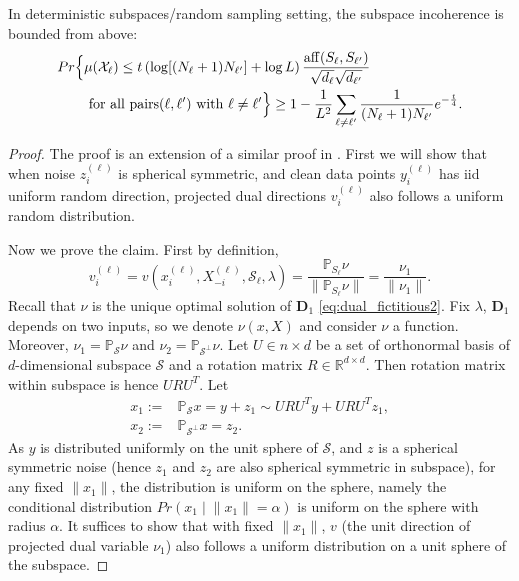 \documentclass[twoside,11pt]{article}
\numberwithin{equation}{section}
\begin{document}
\begin{lemma}\label{lemma:deterministic_incoherence}
In deterministic subspaces/random sampling setting, the subspace incoherence is bounded from above:
\begin{align*}
   Pr\Bigl\{&\mu(\mathcal{X}_{\ell})\leq t\left(\log[(N_{\ell}+1)N_{\ell^\prime}]+\log L\right)\frac{\mathrm{aff}(S_{\ell},S_{\ell^\prime})}{\sqrt{d_{\ell}}\sqrt{d_{\ell^\prime}}}\\
   &\text{ for all pairs}(\ell,\ell^\prime)\text{ with }\ell\neq \ell^\prime\Bigr\}
   \geq 1- \frac{1}{L^2}\sum_{\ell\neq \ell^\prime} \frac{1}{(N_{\ell}+1)N_{\ell^\prime}}e^{-\frac{t}{4}}.
\end{align*}
\end{lemma}
\begin{proof}
The proof is an extension of a similar proof in \citet{soltanolkotabi2011geometric}.
First we will show that when noise $z_i^{(\ell)}$ is spherical symmetric, and clean data points $y_i^{(\ell)}$ has iid uniform random direction, projected dual directions $v_i^{(\ell)}$ also follows a uniform random distribution.

Now we  prove the claim. First by definition,
$$ v_i^{(\ell)} = v(x_i^{(\ell)},X_{-i}^{(\ell)},\mathcal{S}_{\ell},\lambda)=\frac{\mathbb{P}_{S_{\ell}}\nu}{\|\mathbb{P}_{S_{\ell}}\nu\|} = \frac{\nu_1}{\|\nu_1\|}.$$
Recall that $\nu$ is the unique optimal solution of $\mathbf{D}_1$ \eqref{eq:dual_fictitious2}. Fix $\lambda$, $\mathbf{D}_1$ depends on two inputs, so we denote $\nu(x,X)$ and consider $\nu$ a function. Moreover, $\nu_1=\mathbb{P}_{\mathcal{S}}\nu$ and $\nu_2=\mathbb{P}_{\mathcal{S}^{\perp}}\nu$. Let $U\in n\times d$ be a set of orthonormal basis of $d$-dimensional subspace $\mathcal{S}$ and a rotation matrix $R\in \mathbb{R}^{d\times d}$. Then rotation matrix within subspace is hence $URU^T$. Let
\begin{align*}
  x_1 :=& \mathbb{P}_{\mathcal{S}} x= y+z_1 \sim URU^Ty + URU^Tz_1,\\
  x_2 :=& \mathbb{P}_{\mathcal{S}^{\perp}} x = z_2.
\end{align*}
As $y$ is distributed uniformly on the unit sphere of $\mathcal{S}$, and $z$ is a spherical symmetric noise (hence $z_1$ and $z_2$ are also spherical symmetric in subspace), for any fixed $\|x_1\|$, the distribution is uniform on the sphere, namely the conditional distribution $Pr\left(x_1\middle|\|x_1\|=\alpha\right)$ is uniform on the sphere with radius $\alpha$. It suffices to show that with fixed $\|x_1\|$, $v$ (the unit direction of projected dual variable $\nu_1$) also follows a uniform distribution on a unit sphere of the subspace.


\end{proof}
\end{document}
